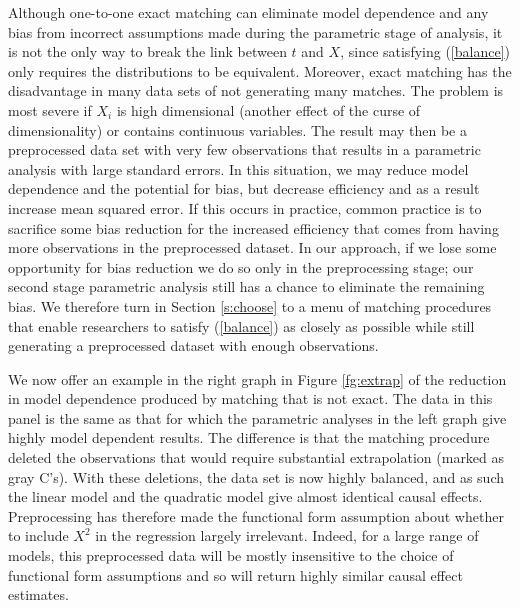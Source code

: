 \documentclass[11pt,titlepage]{article}
\begin{document}
Although one-to-one exact matching can eliminate model dependence and
any bias from incorrect assumptions made during the parametric stage
of analysis, it is not the only way to break the link between $t$ and
$X$, since satisfying (\ref{balance}) only requires the distributions
to be equivalent.  Moreover, exact matching has the disadvantage in
many data sets of not generating many matches.  The problem is most
severe if $X_i$ is high dimensional (another effect of the curse of
dimensionality) or contains continuous variables.  The result may then
be a preprocessed data set with very few observations that results in
a parametric analysis with large standard errors.  In this situation,
we may reduce model dependence and the potential for bias, but
decrease efficiency and as a result increase mean squared error.  If
this occurs in practice, common practice is to sacrifice some bias
reduction for the increased efficiency that comes from having more
observations in the preprocessed dataset.  In our approach, if we lose
some opportunity for bias reduction we do so only in the preprocessing
stage; our second stage parametric analysis still has a chance to
eliminate the remaining bias.  We therefore turn in Section
\ref{s:choose} to a menu of matching procedures that enable
researchers to satisfy (\ref{balance}) as closely as possible while
still generating a preprocessed dataset with enough observations.

We now offer an example in the right graph in Figure \ref{fg:extrap}
of the reduction in model dependence produced by matching that is not
exact.  The data in this panel is the same as that for which the
parametric analyses in the left graph give highly model dependent
results.  The difference is that the matching procedure deleted the
observations that would require substantial extrapolation (marked as
gray C's).  With these deletions, the data set is now highly balanced,
and as such the linear model and the quadratic model give almost
identical causal effects.  Preprocessing has therefore made the
functional form assumption about whether to include $X^2$ in the
regression largely irrelevant.  Indeed, for a large range of models,
this preprocessed data will be mostly insensitive to the choice of
functional form assumptions and so will return highly similar causal
effect estimates.
\end{document}
